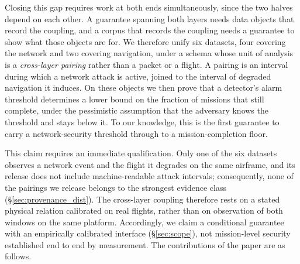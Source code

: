 Closing this gap requires work at both ends simultaneously, since the two halves
depend on each other. A guarantee spanning both layers needs data objects that
record the coupling, and a corpus that records the coupling needs a guarantee to
show what those objects are for. We therefore unify six datasets, four covering
the network and two covering navigation, under a schema whose unit of analysis
is a \emph{cross-layer pairing} rather than a packet or a flight. A pairing is
an interval during which a network attack is active, joined to the interval of
degraded navigation it induces. On these objects we then prove that a detector's
alarm threshold determines a lower bound on the fraction of missions that still
complete, under the pessimistic assumption that the adversary knows the
threshold and stays below it. To our knowledge, this is the first guarantee to
carry a network-security threshold through to a mission-completion floor.

This claim requires an immediate qualification. Only one of the six datasets
observes a network event and the flight it degrades on the same airframe, and
its release does not include machine-readable attack intervals; consequently,
none of the pairings we release belongs to the strongest evidence class
(\S\ref{sec:provenance_dist}). The cross-layer coupling therefore rests on a
stated physical relation calibrated on real flights, rather than on observation
of both windows on the same platform. Accordingly, we claim a conditional
guarantee with an empirically calibrated interface (\S\ref{sec:scope}), not
mission-level security established end to end by measurement. The contributions
of the paper are as follows.


